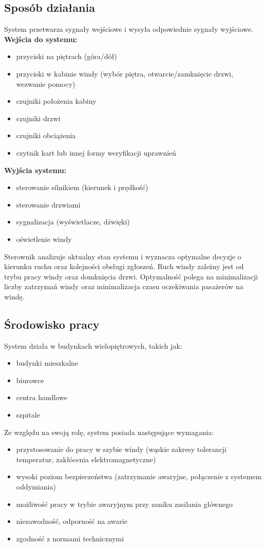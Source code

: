 \documentclass[a4paper,12pt]{article}
\begin{document}
\subsection{Sposób działania}
System przetwarza sygnały wejściowe i wysyła odpowiednie sygnały wyjściowe.
\bigskip
\\
\textbf{Wejścia do systemu:}
\begin{itemize}
    \item przyciski na piętrach (góra/dół)
    \item przyciski w kabinie windy (wybór piętra, otwarcie/zamknięcie drzwi, wezwanie pomocy)
    \item czujniki położenia kabiny
    \item czujniki drzwi
    \item czujniki obciążenia
    \item czytnik kart lub innej formy weryfikacji uprawnień
\end{itemize}
\bigskip
\textbf{Wyjścia systemu:}
\begin{itemize}
    \item sterowanie silnikiem (kierunek i prędkość)
    \item sterowanie drzwiami
    \item sygnalizacja (wyświetlacze, dźwięki)
    \item oświetlenie windy
\end{itemize}
\bigskip
Sterownik analizuje aktualny stan systemu i wyznacza optymalne decyzje o kierunku ruchu oraz kolejności obsługi zgłoszeń.
Ruch windy zależny jest od trybu pracy windy oraz domknięcia drzwi.
Optymalność polega na minimalizacji liczby zatrzymań windy oraz minimalizacja czasu oczekiwania pasażerów na windę.
\subsection{Środowisko pracy}
System działa w budynkach wielopiętrowych, takich jak:
\begin{itemize}
    \item budynki mieszkalne
    \item biurowce
    \item centra handlowe
    \item szpitale
\end{itemize}
Ze względu na swoją rolę, system posiada następujące wymagania:
\begin{itemize}
    \item przystosowanie do pracy w szybie windy (wąskie zakresy tolerancji temperatur, zakłócenia elektromagnetyczne)
    \item wysoki poziom bezpieczeństwa (zatrzymanie awaryjne, połączenie z systemem oddymiania)
    \item możliwość pracy w trybie awaryjnym przy zaniku zasilania głównego
    \item niezawodność, odporność na awarie
    \item zgodność z normami technicznymi
\end{itemize}
\end{document}
